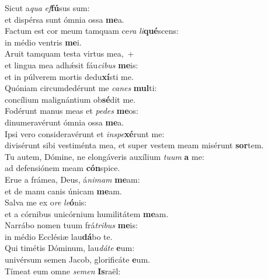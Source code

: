 \evenverse Sicut a\textit{qua} \textit{ef}\textbf{fú}sus sum:~\*\\
\evenverse et dispérsa sunt ómnia ossa \textbf{me}a.\\
\oddverse Factum est cor meum tamquam ce\textit{ra} \textit{li}\textbf{qué}scens:~\*\\
\oddverse in médio ventris \textbf{me}i.\\
\evenverse Aruit tamquam testa virtus mea,~+\\
\evenverse  et lingua mea adhǽsit fáu\textit{ci}\textit{bus} \textbf{me}is:~\*\\
\evenverse et in púlverem mortis dedu\textbf{xí}sti me.\\
\oddverse Quóniam circumdedérunt me \textit{ca}\textit{nes} \textbf{mul}ti:~\*\\
\oddverse concílium malignántium ob\textbf{sé}dit me.\\
\evenverse Fodérunt manus meas et \textit{pe}\textit{des} \textbf{me}os:~\*\\
\evenverse dinumeravérunt ómnia ossa \textbf{me}a.\\
\oddverse Ipsi vero consideravérunt et \textit{in}\textit{spe}\textbf{xé}runt me:~\*\\
\oddverse divisérunt sibi vestiménta mea, et super vestem meam misérunt \textbf{sor}tem.\\
\evenverse Tu autem, Dómine, ne elongáveris auxílium \textit{tu}\textit{um} \textbf{a} me:~\*\\
\evenverse ad defensiónem meam \textbf{cón}spice.\\
\oddverse Erue a frámea, Deus, á\textit{ni}\textit{mam} \textbf{me}am:~\*\\
\oddverse et de manu canis únicam \textbf{me}am.\\
\evenverse Salva me ex o\textit{re} \textit{le}\textbf{ó}nis:~\*\\
\evenverse et a córnibus unicórnium humilitátem \textbf{me}am.\\
\oddverse Narrábo nomen tuum frá\textit{tri}\textit{bus} \textbf{me}is:~\*\\
\oddverse in médio Ecclésiæ lau\textbf{dá}bo te.\\
\evenverse Qui timétis Dóminum, lau\textit{dá}\textit{te} \textbf{e}um:~\*\\
\evenverse univérsum semen Jacob, glorificáte \textbf{e}um.\\
\oddverse Tímeat eum omne \textit{se}\textit{men} \textbf{Is}raël:~\*\\
